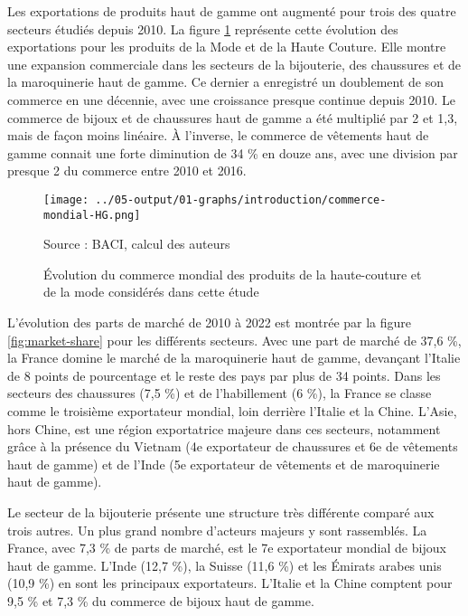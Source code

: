 \documentclass[french,10pt,a4paper]{article}
\begin{document}
Les exportations de produits haut de gamme ont augmenté pour trois des quatre secteurs étudiés depuis 2010. La figure \ref{fig:commerce-mondial-HG} représente cette évolution des exportations pour les produits de la Mode et de la Haute Couture. Elle montre une expansion commerciale dans les secteurs de la bijouterie, des chaussures et de la maroquinerie haut de gamme. Ce dernier a enregistré un doublement de son commerce en une décennie, avec une croissance presque continue depuis 2010. Le commerce de bijoux et de chaussures haut de gamme a été multiplié par 2 et 1,3, mais de façon moins linéaire. À l'inverse, le commerce de vêtements haut de gamme connait une forte diminution de 34 \% en douze ans, avec une division par presque 2 du commerce entre 2010 et 2016.

\begin{figure}[!h]
  \centering
  \texttt{[image: ../05-output/01-graphs/introduction/commerce-mondial-HG.png]}
  \captionsetup{justification=raggedright,singlelinecheck=false, font=small}
  \caption*{Source : BACI, calcul des auteurs}
  \captionsetup{justification=centering, singlelinecheck=true, font=normalsize}
  \caption{Évolution du commerce mondial des produits de la haute-couture et de la mode considérés dans cette étude}
  \label{fig:commerce-mondial-HG}
\end{figure}

\bigskip

L'évolution des parts de marché de 2010 à 2022 est montrée par la figure \ref{fig:market-share} pour les différents secteurs. Avec une part de marché de 37,6 \%, la France domine le marché de la maroquinerie haut de gamme, devançant l'Italie de 8 points de pourcentage et le reste des pays par plus de 34 points. Dans les secteurs des chaussures (7,5 \%) et de l'habillement (6 \%), la France se classe comme le troisième exportateur mondial, loin derrière l'Italie et la Chine. L'Asie, hors Chine, est une région exportatrice majeure dans ces secteurs, notamment grâce à la présence du Vietnam (4e exportateur de chaussures et 6e de vêtements haut de gamme) et de l'Inde (5e exportateur de vêtements et de maroquinerie haut de gamme). 

Le secteur de la bijouterie présente une structure très différente comparé aux trois autres. Un plus grand nombre d'acteurs majeurs y sont rassemblés. La France, avec 7,3 \% de parts de marché, est le 7e exportateur mondial de bijoux haut de gamme. L'Inde (12,7 \%), la Suisse (11,6 \%) et les Émirats arabes unis (10,9 \%) en sont les principaux exportateurs. L'Italie et la Chine comptent pour 9,5 \% et 7,3 \% du commerce de bijoux haut de gamme.
\end{document}
